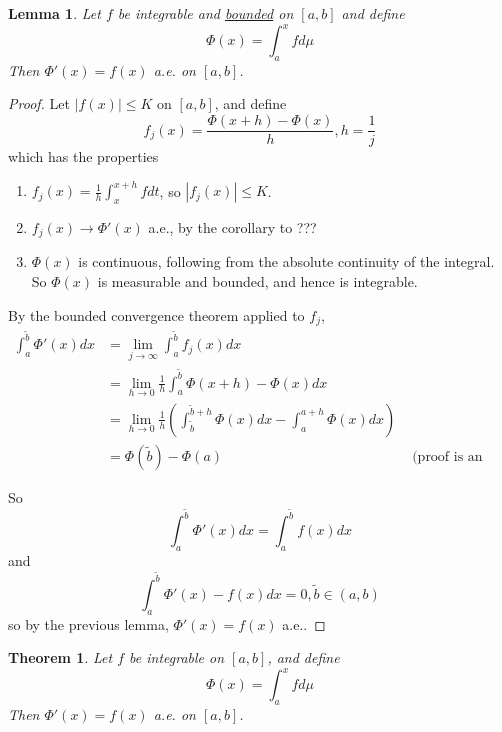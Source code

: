 \documentclass[11pt,a4paper]{report}
\newtheorem{lemma}[theorem]{Lemma}
\theoremstyle{plain}
\newtheorem{thm}{Theorem}[section]
\theoremstyle{definition}
\theoremstyle{remark}
\newcommand{\abs}[1]{\left| #1 \right|}
\begin{document}
\begin{lemma}
  Let $f$ be integrable and \underline{bounded} on $[a, b]$ and define
  $$ \Phi(x) = \int_a^x f d\mu $$
  Then $\Phi'(x) = f(x)$ a.e. on $[a, b]$.
\end{lemma}

\begin{proof}
  Let $\abs{f(x)} \le K$ on $[a, b]$, and define
  $$ f_j(x) = \frac{\Phi(x+h) - \Phi(x)}{h}, h = \frac{1}{j} $$
  which has the properties
  \begin{enumerate}
     \item $f_j(x) = \frac{1}{h} \int_x^{x+h} f dt$, so $\abs{f_j(x)} \le K$.
     \item $f_j(x) \rightarrow \Phi'(x)$ a.e., by the corollary to ???
     \item $\Phi(x)$ is continuous, following from the absolute continuity of the integral. So $\Phi(x)$ is measurable and bounded, and hence is integrable.
  \end{enumerate}

  By the bounded convergence theorem applied to $f_j$, 
  \begin{align*}
      \int_a^{\tilde b} \Phi'(x) dx &= \lim_{j \to \infty} \int_a^{\tilde b} f_j(x) dx \\
      &= \lim_{h \to 0} \frac{1}{h} \int_a^{\tilde b} \Phi(x + h) - \Phi(x) dx \\
      &= \lim_{h \to 0} \frac{1}{h} \left(\int_{\tilde b}^{\tilde b + h} \Phi(x) dx - \int_a^{a+h} \Phi(x) dx \right) \\
      &= \Phi(\tilde b) - \Phi(a) &\text{ (proof is an exercise)} 
  \end{align*}

  So
  $$ \int_a^{\tilde b} \Phi'(x) dx = \int_a^{\tilde b} f(x) dx $$
  and
  $$ \int_a^{\tilde b} \Phi'(x) - f(x) dx = 0, \tilde b \in (a, b) $$
  so by the previous lemma, $\Phi'(x) = f(x)$ a.e..
\end{proof}

\begin{thm}
  Let $f$ be integrable on $[a, b]$, and define
    $$ \Phi(x) = \int_a^x f d\mu$$
  Then $\Phi'(x) = f(x)$ a.e. on $[a, b]$.
\end{thm}
\end{document}
